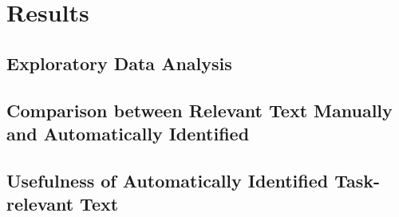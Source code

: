 
\section{Results}
\label{cp6:results}



\subsection{Exploratory Data Analysis}




\subsection{Comparison between Relevant Text Manually and Automatically Identified}




\subsection{Usefulness of Automatically Identified Task-relevant Text}


